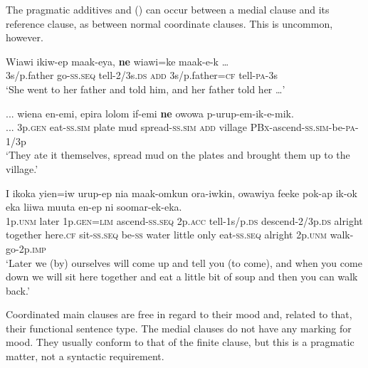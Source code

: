 The pragmatic additives  and  () can occur between a medial clause and its reference clause, as between normal coordinate clauses. This is uncommon, however.

\ea%
\label{ex:8:x2000} %
\gll Wiawi  ikiw-ep  maak-eya,  \textbf{ne}  wiawi=ke  maak-e-k  {\dots} \\
3s/p.father  go-\textsc{ss}.\textsc{seq} tell-2/3s.\textsc{ds} \textsc{add}  3s/p.father=\textsc{cf} tell-\textsc{pa}-3s\\
\glt`She went to her father and told him, and her father told her {\dots}'
\z


\ea%
\label{ex:8:x1485}
\gll ...  wiena  en-emi,  epira  lolom  if-emi  \textbf{ne}  owowa p-urup-em-ik-e-mik.\\
...  3p.\textsc{gen} eat-\textsc{ss}.\textsc{sim} plate  mud  spread-\textsc{ss}.\textsc{sim} \textsc{add} village \textsc{PBx}-ascend-\textsc{ss}.\textsc{sim}-be-\textsc{pa}-1/3p\\
\glt`They ate it themselves, spread mud on the plates and brought them up to the village.'
\z


\ea%
\label{ex:8:x1486} %
\gll I  ikoka  yien=iw  urup-ep  nia  maak-omkun ora-iwkin,    owawiya  feeke  pok-ap  ik-ok  eka liiwa  muuta  en-ep    ni  soomar-ek-eka.\\
1p.\textsc{unm} later 1p.\textsc{gen}=\textsc{lim} ascend-\textsc{ss}.\textsc{seq} 2p.\textsc{acc} tell-1s/p.\textsc{ds} descend-2/3p.\textsc{ds} alright together here.\textsc{cf} sit-\textsc{ss}.\textsc{seq} be-\textsc{ss} water little  only  eat-\textsc{ss}.\textsc{seq} alright  2p.\textsc{unm} walk-go-2p.\textsc{imp}\\
\glt`Later we (by) ourselves will come up and tell you (to come), and when you come down we will sit here together and eat a little bit of soup and then you can walk back.'
\z


Coordinated main clauses are free in regard to their mood and, related to that, their functional sentence type. The medial clauses do not have any marking for mood.  They usually conform to that of the finite clause, but this is a pragmatic matter, not a syntactic requirement. 

